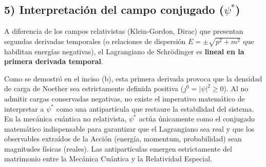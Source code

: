 \subsection*{5) Interpretación del campo conjugado ($\psi^*$)}
A diferencia de los campos relativistas (Klein-Gordon, Dirac) que presentan segundas derivadas temporales (o relaciones de dispersión $E = \pm\sqrt{p^2+m^2}$ que habilitan energías negativas), el Lagrangiano de Schrödinger es \textbf{lineal en la primera derivada temporal}. 

Como se demostró en el inciso (b), esta primera derivada provoca que la densidad de carga de Noether sea estrictamente definida positiva ($j^0 = |\psi|^2 \ge 0$). Al no admitir cargas conservadas negativas, no existe el imperativo matemático de interpretar a $\psi^*$ como una antipartícula que restaure la estabilidad del sistema. En la mecánica cuántica no relativista, $\psi^*$ actúa únicamente como el conjugado matemático indispensable para garantizar que el Lagrangiano sea real y que los observables extraídos de la Acción (energía, momentum, probabilidad) sean magnitudes físicas (reales). Las antipartículas emergen estrictamente del matrimonio entre la Mecánica Cuántica y la Relatividad Especial.





\renewcommand{\labelenumi}{\theenumi} %
